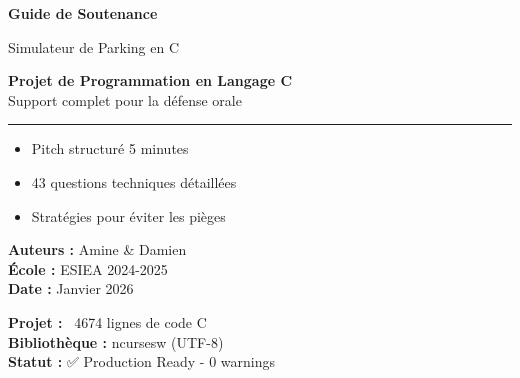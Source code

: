 \documentclass[12pt,a4paper]{article}
\begin{document}
\begin{titlepage}
    \centering

    \vspace*{2cm}

    {\Huge\bfseries Guide de Soutenance\par}
    \vspace{1cm}
    {\LARGE Simulateur de Parking en C\par}

    \vspace{2cm}

    \begin{tcolorbox}[colback=primaryblue!10, colframe=primaryblue, boxrule=2pt, arc=5pt, width=0.8\textwidth]
        \centering
        {\Large\textbf{Projet de Programmation en Langage C}}\\[0.5cm]
        {\large Support complet pour la défense orale}\\[0.3cm]
        \hrule
        \vspace{0.3cm}
        \begin{itemize}[leftmargin=2cm]
            \item[\faLightbulb] Pitch structuré 5 minutes
            \item[\faQuestion] 43 questions techniques détaillées
            \item[\faCheckCircle] Stratégies pour éviter les pièges
        \end{itemize}
    \end{tcolorbox}

    \vspace{2cm}

    {\large
    \textbf{Auteurs :} Amine \& Damien\\[0.3cm]
    \textbf{École :} ESIEA 2024-2025\\[0.3cm]
    \textbf{Date :} Janvier 2026\\[0.3cm]
    }

    \vfill

    \begin{tcolorbox}[colback=lightgray, colframe=darkgray, boxrule=1pt]
        \centering
        \textbf{Projet :} ~4674 lignes de code C\\
        \textbf{Bibliothèque :} ncursesw (UTF-8)\\
        \textbf{Statut :} ✅ Production Ready - 0 warnings
    \end{tcolorbox}

\end{titlepage}
\end{document}
